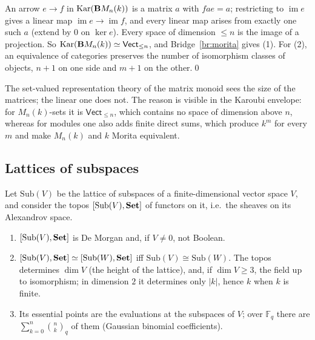 \direct{} An arrow $e\to f$ in $\operatorname{Kar}(\mathbf{B} M_n(k))$ is a matrix $a$ with $fae = a$; restricting to $\operatorname{im}e$ gives a linear map $\operatorname{im}e\to\operatorname{im}f$, and every linear map arises from exactly one such $a$ (extend by $0$ on $\ker e$). Every space of dimension $\le n$ is the image of a projection. So $\operatorname{Kar}(\mathbf{B} M_n(k))\simeq\mathsf{Vect}_{\le n}$, and Bridge~\ref{br:morita} gives (1). For (2), an equivalence of categories preserves the number of isomorphism classes of objects, $n+1$ on one side and $m+1$ on the other.\qed

\inwords{} The set-valued representation theory of the matrix monoid sees the size of the matrices; the linear one does not. The reason is visible in the Karoubi envelope: for $M_n(k)$-sets it is $\mathsf{Vect}_{\le n}$, which contains no space of dimension above $n$, whereas for modules one also adds finite direct sums, which produce $k^m$ for every $m$ and make $M_n(k)$ and $k$ Morita equivalent.

\subsection{Lattices of subspaces}

Let $\mathrm{Sub}(V)$ be the lattice of subspaces of a finite-dimensional vector space $V$, and consider the topos $[\mathrm{Sub}(V),\mathbf{Set}]$ of functors on it, i.e.\ the sheaves on its Alexandrov space.

\begin{theorem}\label{th:subspaces}
\begin{enumerate}
\item $[\mathrm{Sub}(V),\mathbf{Set}]$ is De Morgan and, if $V\neq 0$, not Boolean.
\item $[\mathrm{Sub}(V),\mathbf{Set}]\simeq[\mathrm{Sub}(W),\mathbf{Set}]$ iff $\mathrm{Sub}(V)\cong\mathrm{Sub}(W)$. The topos determines $\dim V$ (the height of the lattice), and, if $\dim V\ge 3$, the field up to isomorphism; in dimension $2$ it determines only $|k|$, hence $k$ when $k$ is finite.
\item Its essential points are the evaluations at the subspaces of $V$; over $\mathbb F_q$ there are $\sum_{k=0}^{n}\binom nk_q$ of them (Gaussian binomial coefficients).
\end{enumerate}
\end{theorem}

